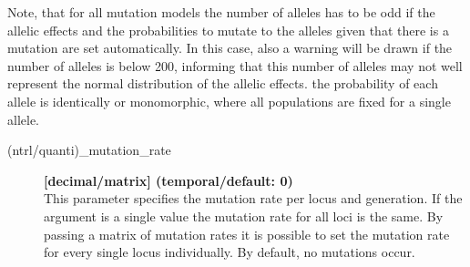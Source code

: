 \documentclass[letterpaper,12pt,oneside]{book}
\begin{document}
Note, that for all mutation models the number of alleles has to be odd if the allelic effects and the probabilities to mutate to the alleles given that there is a mutation are set automatically. In this case, also a warning will be drawn if the number of alleles is below 200, informing that this number of alleles may not well represent the normal distribution of the allelic effects.
the probability of each allele is identically or monomorphic, where all populations are fixed for a single allele.   
\begin{description}
\item[(ntrl/quanti)\_mutation\_rate] \textbf{[decimal/matrix] (temporal/default: 0)}\\
This parameter specifies the mutation rate per locus and generation. If the argument is a single value the mutation rate for all loci is the same. By passing a matrix of mutation rates it is possible to set the mutation rate for every single locus individually. By default, no mutations occur.

\end{description}
\end{document}
